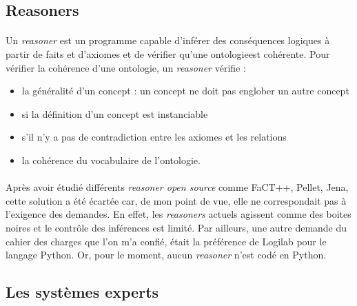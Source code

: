 \documentclass {report}
\begin{document}

\subsection{Reasoners}
\paragraph{}
Un \textit{reasoner} est un programme capable d'inférer des conséquences logiques à partir de faits et d'axiomes et de vérifier qu'une ontologie\footnotemark[1] est cohérente. Pour vérifier la cohérence d'une ontologie, un \textit{reasoner} vérifie : 
\begin{itemize}
\item la généralité d'un concept : un concept ne doit pas englober un autre concept
\item si la définition d'un concept est instanciable
\item s'il n'y a pas de contradiction entre les axiomes et les relations
\item la cohérence du vocabulaire de l'ontologie.
\end{itemize}
\paragraph{}
Après avoir étudié différents \textit{reasoner open source} comme FaCT++, Pellet, Jena, cette solution a été écartée car, de mon point de vue, elle ne correspondait pas à l'exigence des demandes. En effet, les \textit{reasoners} actuels agissent comme des boites noires et le contrôle des inférences est limité. Par ailleurs, une autre demande du cahier des charges que l'on m'a confié, était la préférence de Logilab pour le langage Python. Or, pour le moment, aucun \textit{reasoner} n'est codé en Python.


    

\subsection{Les systèmes experts}
\end{document}
